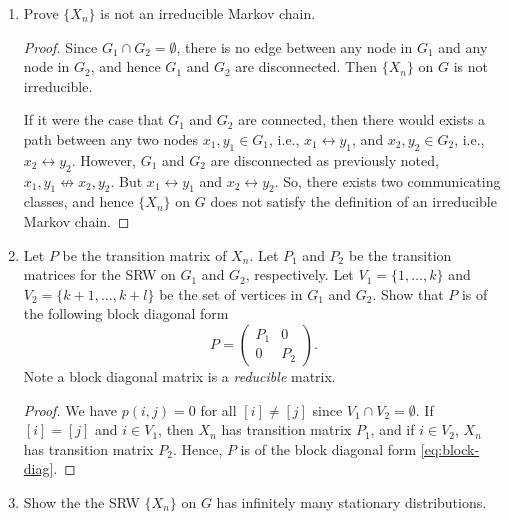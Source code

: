 \documentclass[oneside,reqno]{amsart}
\theoremstyle{definition}
\begin{document}
\begin{enumerate}
\item
Prove $\{X_n\}$ is not an irreducible Markov chain. 

\begin{proof}
Since $G_1 \cap G_2 = \emptyset$, there is no edge between any node in $G_1$ and any node in $G_2$, and hence $G_1$ and $G_2$ are disconnected. Then $\{X_n\}$ on $G$ is not irreducible. 
\par
If it were the case that $G_1$ and $G_2$ are connected, then there would exists a path between any two nodes $x_1, y_1 \in G_1$, i.e., $x_1 \leftrightarrow y_1$, and $x_2, y_2 \in G_2$, i.e., $x_2 \leftrightarrow y_2$. However, $G_1$ and $G_2$ are disconnected as previously noted, $x_1,y_1 \not\leftrightarrow x_2,y_2$. But $x_1 \leftrightarrow y_1$ and $x_2 \leftrightarrow y_2$. So, there exists two communicating classes, and hence $\{X_n\}$ on $G$ does not satisfy the definition of an irreducible Markov chain.
\end{proof}

\item
Let $P$ be the transition matrix of $X_n$. Let $P_1$ and $P_2$ be the transition matrices for the SRW on $G_1$ and $G_2$, respectively. Let $V_1 =\{1,\dotsc,k\}$ and $V_2 =\{k+1,\dotsc,k+l\}$ be the set of vertices in $G_1$ and $G_2$. Show that $P$ is of the following block diagonal form 
\begin{equation}\label{eq:block-diag}
	P = \begin{pmatrix}
		P_1 & 0 \\
		0 & P_2 
	\end{pmatrix}.
\end{equation}
Note a block diagonal matrix is a \emph{reducible} matrix.

\begin{proof}
We have $p(i,j) = 0$ for all $[i] \neq [j]$ since $V_1 \cap V_2 = \emptyset$. If $[i] = [j]$ and $i \in V_1$, then $X_n$ has transition matrix $P_1$, and if $i \in V_2$, $X_n$ has transition matrix $P_2$. Hence, $P$ is of the block diagonal form \eqref{eq:block-diag}.
\end{proof}


\item
Show the the SRW $\{X_n\}$ on $G$ has infinitely many stationary distributions. 


\end{enumerate}
\end{document}
